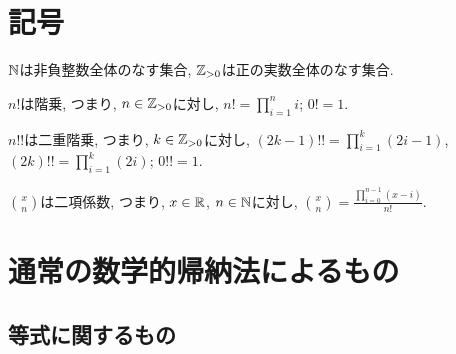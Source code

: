 \section{記号}
$\mathbb{N}$は非負整数全体のなす集合,
$\mathbb{Z}_{>0}$は正の実数全体のなす集合.

$n!$は階乗, つまり, $n\in \mathbb{Z}_{>0}$に対し, $n!=\prod_{i=1}^n i$;
$0!=1$.

$n!!$は二重階乗, つまり, $k\in \mathbb{Z}_{>0}$に対し, 
$(2k-1)!!=\prod_{i=1}^k (2i-1)$, $(2k)!!=\prod_{i=1}^k (2i)$;
$0!!=1$.

$\binom{x}{n}$は二項係数, つまり,
$x\in\mathbb{R}$, $n\in \mathbb{N}$に対し,
$\binom{x}{n}=\frac{\prod_{i=0}^{n-1}(x-i)}{n!}$.

\section{通常の数学的帰納法によるもの}
\subsection{等式に関するもの}
